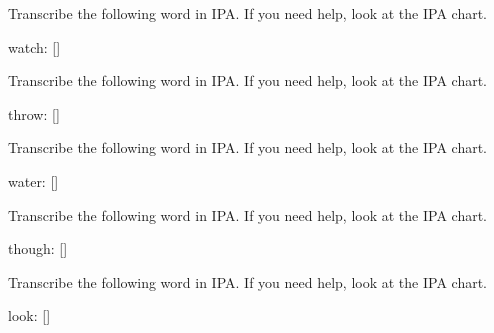 \documentclass[12pt,a4paper,article]{memoir} %
\begin{document}
\begin{enumerate}
{\itshape 

\item Transcribe the following word in IPA. If you need help, look at the IPA chart.

{\normalfont watch:} [\underline{\hspace{1cm}}]

\vspace{0.5cm}

\makebox[\linewidth]{\rule{\paperwidth}{0.4pt}}

\vspace{0.5cm}

\item Transcribe the following word in IPA. If you need help, look at the IPA chart.

{\normalfont throw: [\underline{\hspace{1cm}}]}

\vspace{0.5cm}

\makebox[\linewidth]{\rule{\paperwidth}{0.4pt}}

\vspace{0.5cm}

\item Transcribe the following word in IPA. If you need help, look at the IPA chart.

{\normalfont water: [\underline{\hspace{1cm}}]}

\vspace{0.5cm}

\makebox[\linewidth]{\rule{\paperwidth}{0.4pt}}

\vspace{0.5cm}

\item Transcribe the following word in IPA. If you need help, look at the IPA chart.

{\normalfont though: [\underline{\hspace{1cm}}]}

\vspace{0.5cm}

\makebox[\linewidth]{\rule{\paperwidth}{0.4pt}}

\vspace{0.5cm}

\item Transcribe the following word in IPA. If you need help, look at the IPA chart.

{\normalfont look: [\underline{\hspace{1cm}}]}

}
\end{enumerate}
\end{document}
